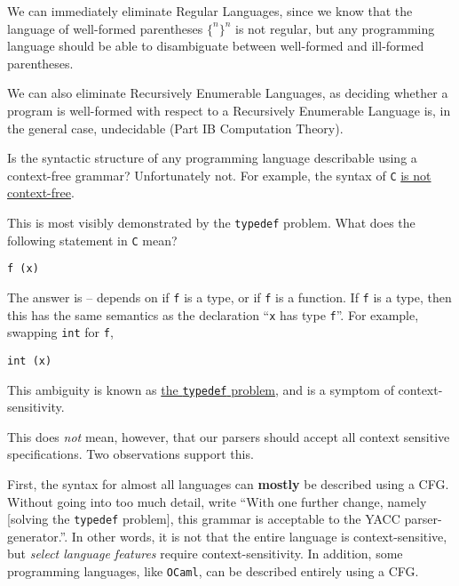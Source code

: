 
We can immediately eliminate Regular Languages, since we know that the language of well-formed parentheses $\{^n \}^n$ is not regular, but any programming language should be able to disambiguate between well-formed and ill-formed parentheses. 

We can also eliminate Recursively Enumerable Languages, as deciding whether a program is well-formed with respect to a Recursively Enumerable Language is, in the general case, undecidable (\textsf{Part IB Computation Theory}). 

Is the syntactic structure of any programming language describable using a context-free grammar? Unfortunately not. For example, the syntax of \texttt{C} \href{https://eli.thegreenplace.net/2007/11/24/the-context-sensitivity-of-cs-grammar#:~:text=There%20is%20no%20way%20to,T%20and%20passed%20to%20func%20.}{is not context-free}.

This is most visibly demonstrated by the \texttt{typedef} problem. What does the following statement in \texttt{C} mean?
\begin{verbatim}
f (x)
\end{verbatim}
The answer is -- depends on if \texttt{f} is a type, or if \texttt{f} is a function. If \texttt{f} is a type, then this has the same semantics as the declaration ``\texttt{x} has type \texttt{f}''. For example, swapping \texttt{int} for \texttt{f},
\begin{verbatim}
int (x)
\end{verbatim}
This ambiguity is known as \href{https://www.gnu.org/software/bison/manual/bison.html#Semantic-Tokens}{the \texttt{typedef} problem}, and is a symptom of context-sensitivity.

This does \textit{not} mean, however, that our parsers should accept all context sensitive specifications. Two observations support this.

First, the syntax for almost all languages can \textbf{mostly} be described using a CFG. Without going into too much detail, \citet{kernighan-1978} write ``With one further change, namely [solving the \texttt{typedef} problem], this grammar is acceptable to the YACC parser-generator.''. In other words, it is not that the entire language is context-sensitive, but \textit{select language features} require context-sensitivity. In addition, some programming languages, like \texttt{OCaml}, can be described entirely using a CFG.

